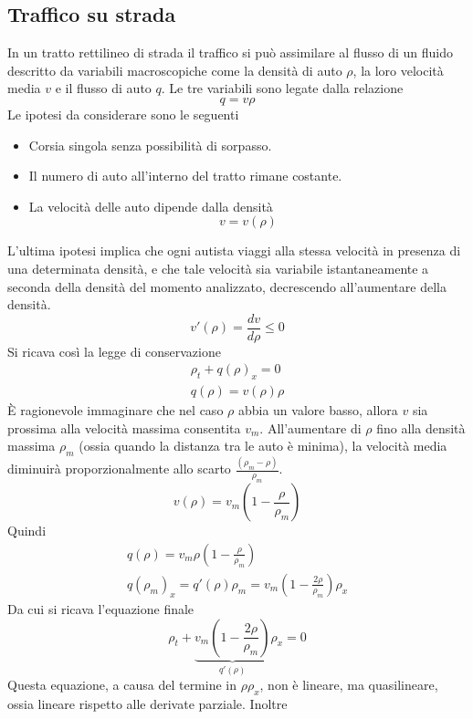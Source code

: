 \documentclass[a4paper,12pt, draft]{article}
\theoremstyle{break}
\numberwithin{equation}{section}
\begin{document}
\subsection{Traffico su strada}
In un tratto rettilineo di strada il traffico si può assimilare al flusso di un fluido descritto da variabili macroscopiche come la densità di auto \(\rho\), la loro velocità media \(v\) e il flusso di auto \(q\). Le tre variabili sono legate dalla relazione 
\[
q = v\rho  
\]
Le ipotesi da considerare sono le seguenti
\begin{itemize}
  \item Corsia singola senza possibilità di sorpasso.
  \item Il numero di auto all'interno del tratto rimane costante.
  \item La velocità delle auto dipende dalla densità
  \[
  v = v(\rho)  
  \]
\end{itemize}
L'ultima ipotesi implica che ogni autista viaggi alla stessa velocità in presenza di una determinata densità, e che tale velocità sia variabile istantaneamente a seconda della densità del momento analizzato, decrescendo all'aumentare della densità.
\[
v'(\rho) = \frac{dv}{d\rho} \leq 0 
\]
Si ricava così la legge di conservazione 
\begin{eqnarray*}
  \rho_t + q(\rho)_x = 0 \\
  q(\rho) = v(\rho)\rho
\end{eqnarray*}
È ragionevole immaginare che nel caso \(\rho\) abbia un valore basso, allora \(v\) sia prossima alla velocità massima consentita \(v_m\). All'aumentare di \(\rho\) fino alla densità massima \(\rho_m\) (ossia quando la distanza tra le auto è minima), la velocità media diminuirà proporzionalmente allo scarto \(\frac{(\rho_m - \rho)}{\rho_m}\). 
\begin{equation}
  v(\rho) = v_m \left(1- \frac{\rho}{\rho_m}\right)
\end{equation}
Quindi 
\begin{eqnarray*}
  q(\rho) = v_m \rho\left(1 -\frac{\rho}{\rho_m}\right) \\
  q(\rho_m)_x = q'(\rho)\rho_m = v_m\left(1-\frac{2\rho}{\rho_m}\right) \rho_x
\end{eqnarray*}
Da cui si ricava l'equazione finale
\begin{equation}
  \rho_t + \underbrace{v_m \left(1-\frac{2\rho}{\rho_m}\right)}_{q'(\rho)} \rho_x = 0
\end{equation}
Questa equazione, a causa del termine in \(\rho\rho_x\), non è lineare, ma quasilineare, ossia lineare rispetto alle derivate parziale. Inoltre
\end{document}
